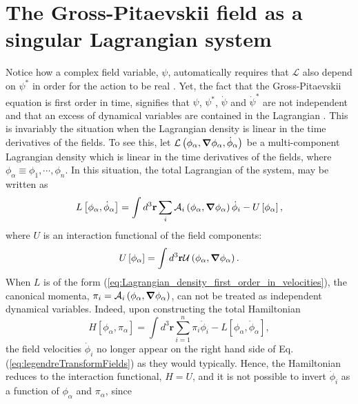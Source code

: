\documentclass[twocolumn, nofootinbib, nobibnotes, amsmath,amssymb,aps, pra, floatfix]{revtex4-1}
\renewcommand{\v}[1]{\ensuremath{\mathbf{#1}}} %
\newcommand{\gv}[1]{\ensuremath{\mbox{\boldmath$ #1 $}}} %
\newcommand{\grad}[1]{\gv{\nabla} #1} %
\begin{document}
\section{\label{sec:GPfieldSingularLagrangianSystem}The Gross-Pitaevskii field as a singular Lagrangian system}
Notice how a complex field variable, $\psi$, automatically requires that $\mathcal{L}$ also depend on $\psi^*$ in order for the action to be real \cite{cohen1992atom}. 
Yet, the fact that the Gross-Pitaevskii equation is first order in time, signifies that $\psi$, $\psi^*$, $\dot{\psi}$ and $\dot{\psi}^*$ are not independent and that an excess of dynamical variables are contained in the Lagrangian \cite{cohen1992atom,schiff1968quantum}. 
This is invariably the situation when the Lagrangian density is linear in the time derivatives of the fields.
To see this, let $\mathcal{L}\left(\phi_{\alpha},\grad{\phi_{\alpha}}, \dot{\phi}_{\alpha}\right)$ be a multi-component Lagrangian density which is linear in the time derivatives of the fields, where $\phi_{\alpha}\equiv\phi_1,\cdots,\phi_n$.
In this situation, the total Lagrangian of the system, may be written as
\begin{equation}
  L\left[ \phi_{\alpha},\dot{\phi}_{\alpha} \right]=\int d^3\v{r}\sum_i\mathcal{A}_i\left(\phi_{\alpha},\grad{\phi}_{\alpha}\right)\dot{\phi}_i-U \left[\phi_{\alpha}\right],
  \label{eq:Lagrangian_density_first_order_in_velocities}
\end{equation}
where $U$ is an interaction functional of the field components:
\begin{equation}
  U\left[\phi_{\alpha}\right]=\int d^3\v{r} \mathcal{U}\left(\phi_{\alpha},\grad{\phi}_{\alpha}\right).
  \label{eq:interaction_functional}
\end{equation}
When $L$ is of the form (\ref{eq:Lagrangian_density_first_order_in_velocities}), the canonical momenta, $\pi_i=\mathcal{A}_i\left( \phi_{\alpha},\grad{}\phi_{\alpha} \right)$, can not be treated as independent dynamical variables.  
Indeed, upon constructing the total Hamiltonian 
\begin{equation}
  H\left[ \phi_{\alpha},\pi_{\alpha} \right]=\int d^3\v{r}\sum_{i=1}^n \pi_i\dot{\phi}_i-L\left[ \phi_{\alpha},\dot{\phi}_{\alpha} \right],
  \label{eq:legendreTransformFields}
\end{equation}
the field velocities $\dot{\phi}_i$ no longer appear on the right hand side of Eq. (\ref{eq:legendreTransformFields}) as they would typically.
Hence, the Hamiltonian reduces to the interaction functional, $H=U$, and it is not possible to invert $\dot{\phi}_i$ as a function of $\phi_{\alpha}$ and $\pi_{\alpha}$, since 
\end{document}

